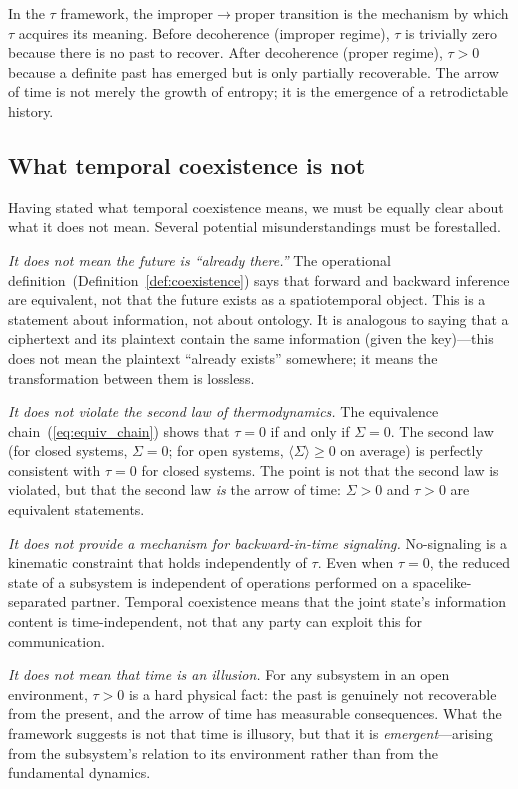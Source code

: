 \documentclass[12pt]{article}
\theoremstyle{definition}
\theoremstyle{remark}
\newcommand{\tauasym}{\tau}
\begin{document}
In the $\tauasym$ framework, the improper$\to$proper transition
is the mechanism by which $\tauasym$ acquires its meaning.  Before
decoherence (improper regime), $\tauasym$ is trivially zero because
there is no past to recover.  After decoherence (proper regime),
$\tauasym > 0$ because a definite past has emerged but is only
partially recoverable.  The arrow of time is not merely the growth
of entropy; it is the emergence of a retrodictable history.

\subsection{What temporal coexistence is not}

Having stated what temporal coexistence means, we must be equally
clear about what it does not mean.  Several potential
misunderstandings must be forestalled.

\emph{It does not mean the future is ``already there.''}
The operational definition~(Definition~\ref{def:coexistence})
says that forward and backward inference are equivalent, not
that the future exists as a spatiotemporal object.  This is a
statement about information, not about ontology.  It is
analogous to saying that a ciphertext and its plaintext contain
the same information (given the key)---this does not mean the
plaintext ``already exists'' somewhere; it means the
transformation between them is lossless.

\emph{It does not violate the second law of thermodynamics.}
The equivalence chain~(\ref{eq:equiv_chain}) shows that
$\tauasym = 0$ if and only if $\Sigma = 0$.  The second law
(for closed systems, $\Sigma = 0$; for open systems,
$\langle\Sigma\rangle \geq 0$ on average) is perfectly
consistent with $\tauasym = 0$ for closed systems.
The point is not that the second law is violated, but that the
second law \emph{is} the arrow of time: $\Sigma > 0$ and
$\tauasym > 0$ are equivalent statements.

\emph{It does not provide a mechanism for backward-in-time
signaling.}
No-signaling is a kinematic constraint that holds independently
of $\tauasym$.  Even when $\tauasym = 0$, the reduced state of
a subsystem is independent of operations performed on a
spacelike-separated partner.  Temporal coexistence means that
the joint state's information content is time-independent, not
that any party can exploit this for communication.

\emph{It does not mean that time is an illusion.}
For any subsystem in an open environment, $\tauasym > 0$ is a
hard physical fact: the past is genuinely not recoverable from
the present, and the arrow of time has measurable consequences.
What the framework suggests is not that time is illusory, but
that it is \emph{emergent}---arising from the subsystem's
relation to its environment rather than from the fundamental
dynamics.
\end{document}
